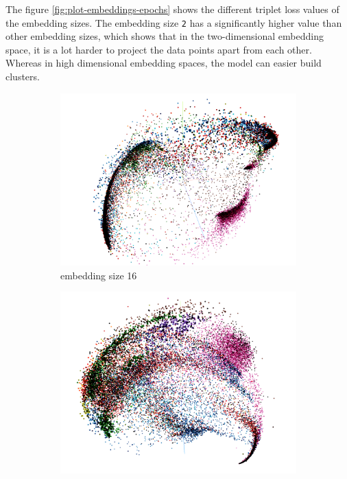 \newline
\newline
The figure \ref{fig:plot-embeddings-epochs} shows the different triplet loss values of the embedding sizes. The embedding size \texttt{2} has a significantly higher value than other embedding sizes, which shows that in the two-dimensional embedding space, it is a lot harder to project the data points apart from each other. Whereas in high dimensional embedding spaces, the model can easier build clusters.
\begin{figure}[t]
\centering
\begin{subfigure}{.33\linewidth}
  \centering
  \includegraphics[width=.9\linewidth]{study-doc/experiment_embedding_size/assets/embedding_space_16.png}
  \caption{embedding size 16}
  \label{fig:embedding-space-16}
\end{subfigure}%
\begin{subfigure}{.33\linewidth}
  \centering
  \includegraphics[width=.9\linewidth]{study-doc/experiment_embedding_size/assets/embedding_space_32.png}

\end{subfigure}
\end{figure}
